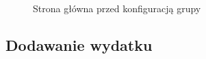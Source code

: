 \documentclass[12pt,a4paper,twoside,titlepage,openright]{book}
\begin{document}
\begin{figure}[h]
\begin{minipage}[t]{0.3\textwidth}
		\caption{Strona główna przed konfiguracją grupy}
		\label{fig:app-stronaGlowna1}
	\end{minipage}
\end{figure}


\subsection{Dodawanie wydatku}
\end{document}
